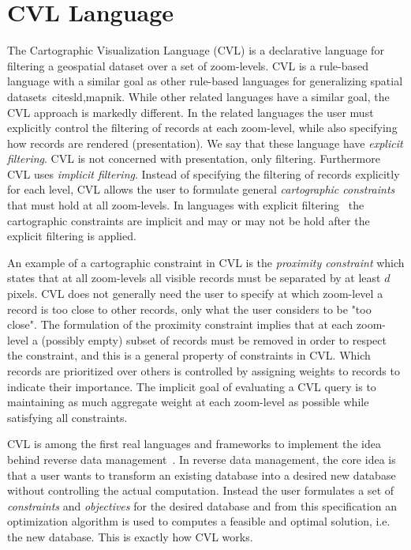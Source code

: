\section{CVL Language}
\label{sec:cvl-language}
The Cartographic Visualization Language (CVL) is a declarative language for filtering a geospatial dataset over a set of zoom-levels. CVL is a rule-based language with a similar goal as other rule-based languages for generalizing spatial datasets~cite{sld,mapnik}. While other related languages have a similar goal, the CVL approach is markedly different. In the related languages the user must explicitly control the filtering of records at each zoom-level, while also specifying how records are rendered (presentation). We say that these language have \emph{explicit filtering}. CVL is not concerned with presentation, only filtering. Furthermore CVL uses \emph{implicit filtering}. Instead of specifying the filtering of records explicitly for each level, CVL allows the user to formulate general \emph{cartographic constraints} that must hold at all zoom-levels. In languages with explicit filtering~\cite{sld,mapnik} the cartographic constraints are implicit and may or may not be hold after the explicit filtering is applied.

An example of a cartographic constraint in CVL is the \emph{proximity constraint} which states that at all zoom-levels all visible records must be separated by at least $d$ pixels. CVL does not generally need the user to specify at which zoom-level a record is too close to other records, only what the user considers to be "too close". The formulation of the proximity constraint implies that at each zoom-level a (possibly empty) subset of records must be removed in order to respect the constraint, and this is a general property of constraints in CVL. Which records are prioritized over others is controlled by assigning weights to records to indicate their importance. The implicit goal of evaluating a CVL query is to maintaining as much aggregate weight at each zoom-level as possible while satisfying all constraints.

CVL is among the first real languages and frameworks to implement the idea behind reverse data management~\cite{reverse}. In reverse data management, the core idea is that a user wants to transform an existing database into a desired new database without controlling the actual computation. Instead the user formulates a set of \emph{constraints} and \emph{objectives} for the desired database and from this specification an optimization algorithm is used to computes a feasible and optimal solution, i.e. the new database. This is exactly how CVL works. 

